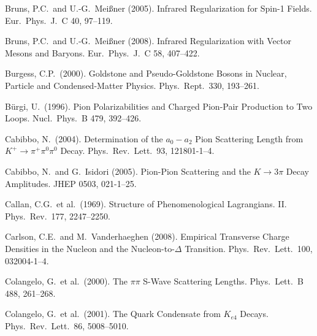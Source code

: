 \documentclass[twoside,12pt]{article}
\begin{document}
\begin{thebibliography}{}
Bruns, P.C.~and U.-G.~Mei{\ss}ner (2005).
Infrared Regularization for Spin-1 Fields.
Eur.\ Phys.\ J.\  C 40, 97--119.

Bruns, P.C.~and U.-G.~Mei{\ss}ner (2008).
Infrared Regularization with Vector Mesons and Baryons.
Eur.\ Phys.\ J.\  C 58, 407--422.

Burgess, C.P.~(2000).
Goldstone and Pseudo-Goldstone Bosons in Nuclear, Particle and
Condensed-Matter Physics.
Phys.\ Rept.\   330, 193--261.

B\"urgi, U.~(1996).
Pion Polarizabilities and Charged Pion-Pair Production to Two Loops.
Nucl.\ Phys.\  B 479, 392--426.

Cabibbo, N.~(2004).
Determination of the $a_0-a_2$ Pion Scattering Length from $K^+\to\pi^+ \pi^0 \pi^0$ Decay.
Phys.\ Rev.\ Lett.\  93, 121801-1--4.

Cabibbo, N.~and G.~Isidori (2005).
Pion-Pion Scattering and the $K\to 3\pi$ Decay Amplitudes.
JHEP 0503, 021-1--25.

Callan, C.G.~et al.~(1969).
Structure of Phenomenological Lagrangians. II.
Phys.\ Rev.\  177, 2247--2250.

Carlson, C.E.~and M.~Vanderhaeghen (2008).
Empirical Transverse Charge Densities in the Nucleon and the
Nucleon-to-$\Delta$ Transition.
Phys.\ Rev.\ Lett.\  100, 032004-1--4.

Colangelo, G.~et al.~(2000).
The $\pi\pi$ S-Wave Scattering Lengths.
Phys.\ Lett.\  B 488, 261--268.

Colangelo, G.~et al.~(2001).
The Quark Condensate from $K_{e4}$ Decays.
Phys.\ Rev.\ Lett.\  86, 5008--5010.


\end{thebibliography}
\end{document}
